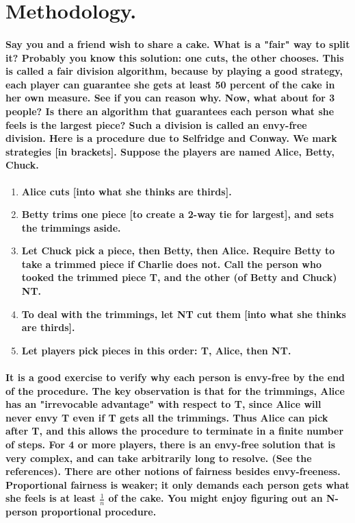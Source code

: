 \documentclass[12pt]{report}
\begin{document}
\section{Methodology.}
\paragraph{Say you and a friend wish to share a cake. What is a "fair" way to split it? Probably you know this solution: one cuts, the other chooses. This is called a fair division algorithm, because by playing a good strategy, each player can guarantee she gets at least 50 percent of the cake in her own measure. See if you can reason why. Now, what about for 3 people? Is there an algorithm that guarantees each person what she feels is the largest piece? Such a division is called an envy-free division. Here is a procedure due to Selfridge and Conway. We mark strategies [in brackets]. Suppose the players are named Alice, Betty, Chuck.}
\begin{enumerate}
	\item \textbf{Alice cuts [into what she thinks are thirds].}
	\item \textbf{Betty trims one piece [to create a 2-way tie for largest], and sets the trimmings aside.}
	\item \textbf{Let Chuck pick a piece, then Betty, then Alice. Require Betty to take a trimmed piece if Charlie does not. Call the person who tooked the trimmed piece T, and the other (of Betty and Chuck) NT.}
	\item \textbf{To deal with the trimmings, let NT cut them [into what she thinks are thirds].}
	\item \textbf{Let players pick pieces in this order: T, Alice, then NT.}
\end{enumerate}
\paragraph{It is a good exercise to verify why each person is envy-free by the end of the procedure. The key observation is that for the trimmings, Alice has an "irrevocable advantage" with respect to T, since Alice will never envy T even if T gets all the trimmings. Thus Alice can pick after T, and this allows the procedure to terminate in a finite number of steps. For 4 or more players, there is an envy-free solution that is very complex, and can take arbitrarily long to resolve. (See the references). There are other notions of fairness besides envy-freeness. Proportional fairness is weaker; it only demands each person gets what she feels is at least 
	$\frac{1}{n}$ of the cake. You might enjoy figuring out an N-person proportional procedure.}
\end{document}
